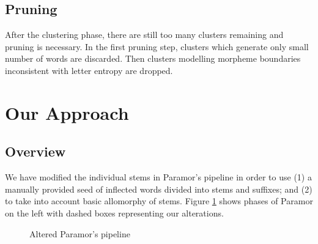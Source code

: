 \documentclass{itatnew}
\begin{document}
\subsection{Pruning}

\noindent
After the clustering phase, there are still too many clusters remaining and pruning is necessary. In the first pruning step, clusters which generate only small number of words are discarded. 
Then clusters modelling morpheme boundaries inconsistent with letter entropy are dropped.


%

\section{Our Approach}

\subsection{Overview}


\noindent
We have modified the individual stems in Paramor's pipeline in order to use (1) a manually provided seed of inflected words divided into stems and suffixes; and (2) to take into account basic allomorphy of stems.
%
Figure \ref{fig:overview} shows phases of Paramor on the left with dashed boxes representing our alterations.


\begin{figure}

\caption{Altered Paramor's pipeline}
\label{fig:overview}
\end{figure}
\end{document}
